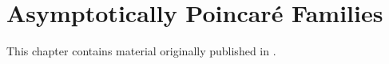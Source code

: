 \chapter{Asymptotically Poincar\'e Families}
\label{main-results-chapter}

\noindent This chapter contains material originally published in \cite{quinn2020}.






